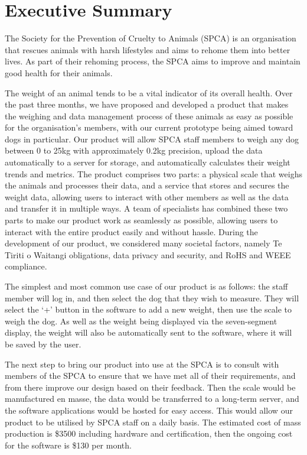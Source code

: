 
\chapter{Executive Summary}

The Society for the Prevention of Cruelty to Animals (SPCA) is an organisation that rescues animals with harsh lifestyles and aims to rehome them into better lives. As part of their rehoming process, the SPCA aims to improve and maintain good health for their animals.

The weight of an animal tends to be a vital indicator of its overall health. Over the past three months, we have proposed and developed a product that makes the weighing and data management process of these animals as easy as possible for the organisation's members, with our current prototype being aimed toward dogs in particular. Our product will allow SPCA staff members to weigh any dog between 0 to 25kg with approximately 0.2kg precision, upload the data automatically to a server for storage, and automatically calculates their weight trends and metrics. The product comprises two parts: a physical scale that weighs the animals and processes their data, and a service that stores and secures the weight data, allowing users to interact with other members as well as the data and transfer it in multiple ways. A team of specialists has combined these two parts to make our product work as seamlessly as possible, allowing users to interact with the entire product easily and without hassle. During the development of our product, we considered many societal factors, namely Te Tiriti o Waitangi obligations, data privacy and security, and RoHS and WEEE compliance. 

The simplest and most common use case of our product is as follows: the staff member will log in, and then select the dog that they wish to measure. They will select the ‘+’ button in the software to add a new weight, then use the scale to weigh the dog. As well as the weight being displayed via the seven-segment display, the weight will also be automatically sent to the software, where it will be saved by the user.

The next step to bring our product into use at the SPCA is to consult with members of the SPCA to ensure that we have met all of their requirements, and from there improve our design based on their feedback. Then the scale would be manufactured en masse, the data would be transferred to a long-term server, and the software applications would be hosted for easy access. This would allow our product to be utilised by SPCA staff on a daily basis. The estimated cost of mass production is \$3500 including hardware and certification, then the ongoing cost for the software is \$130 per month.

